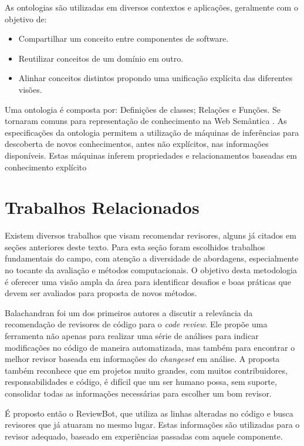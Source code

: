 \documentclass[sigconf]{acmart}
\begin{document}
As ontologias são utilizadas em diversos contextos e aplicações, geralmente com o objetivo de:

\begin{itemize}
  \item Compartilhar um conceito entre componentes de software.
  \item Reutilizar conceitos de um domínio em outro.
  \item Alinhar conceitos distintos propondo uma unificação explícita das diferentes visões.
\end{itemize}

Uma ontologia é composta por: Definições de classes; Relações e Funções. Se tornaram comuns para representação de conhecimento na Web Semântica \cite{berners2001}. As especificações da ontologia permitem a utilização de máquinas de inferências para descoberta de novos conhecimentos, antes não explícitos, nas informações disponíveis. Estas máquinas inferem propriedades e relacionamentos baseadas em conhecimento explícito \cite{berners2001}


\section{Trabalhos Relacionados}\label{cha:relacionados}

Existem diversos trabalhos que visam recomendar revisores, alguns já citados em seções anteriores deste texto. Para esta seção foram escolhidos trabalhos fundamentais do campo, com atenção a diversidade de abordagens, especialmente no tocante da avaliação e métodos computacionais. O objetivo desta metodologia é oferecer uma visão ampla da área para identificar desafios e boas práticas que devem ser avaliados para proposta de novos métodos.

Balachandran \cite{balachandran2013} foi um dos primeiros autores a discutir a relevância da recomendação de revisores de código para o \textit{code review}. Ele propõe uma ferramenta não apenas para realizar uma série de análises para indicar modificações no código de maneira automatizada, mas também para encontrar o melhor revisor baseada em informações do \textit{changeset} em análise. A proposta também reconhece que em projetos muito grandes,  com muitos contribuidores, responsabilidades e código, é difícil que um ser humano possa, sem suporte, consolidar todas as informações necessárias para escolher um bom revisor.

É proposto então o ReviewBot, que utiliza as linhas alteradas no código e busca revisores que já atuaram no mesmo lugar. Estas informações são utilizadas para o revisor adequado, baseado em experiências passadas com aquele componente.
\end{document}
